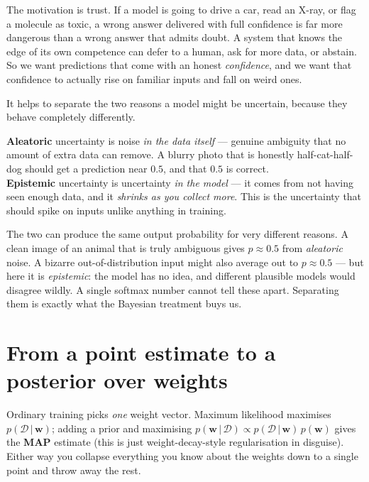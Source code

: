 \documentclass[11pt, oneside]{book}
\newcommand{\dataset}{\mathcal{D}}
\newcommand{\weights}{\mathbf{w}}
\newcommand{\given}{\,\vert\,}
\begin{document}
The motivation is trust. If a model is going to drive a car, read an X-ray, or
flag a molecule as toxic, a wrong answer delivered with full confidence is far
more dangerous than a wrong answer that admits doubt. A system that knows the edge
of its own competence can defer to a human, ask for more data, or abstain. So we
want predictions that come with an honest \emph{confidence}, and we want that
confidence to actually rise on familiar inputs and fall on weird ones.

It helps to separate the two reasons a model might be uncertain, because they
behave completely differently.

\begin{defbox}[title={Aleatoric vs.\ epistemic uncertainty}]
\textbf{Aleatoric} uncertainty is noise \emph{in the data itself} --- genuine
ambiguity that no amount of extra data can remove. A blurry photo that is honestly
half-cat-half-dog should get a prediction near $0.5$, and that $0.5$ is correct.
\\[2pt]
\textbf{Epistemic} uncertainty is uncertainty \emph{in the model} --- it comes
from not having seen enough data, and it \emph{shrinks as you collect more}. This
is the uncertainty that should spike on inputs unlike anything in training.
\end{defbox}

\begin{intbox}
The two can produce the same output probability for very different reasons.
A clean image of an animal that is truly ambiguous gives $p\approx 0.5$ from
\emph{aleatoric} noise. A bizarre out-of-distribution input might also average out
to $p\approx 0.5$ --- but here it is \emph{epistemic}: the model has no idea, and
different plausible models would disagree wildly. A single softmax number cannot
tell these apart. Separating them is exactly what the Bayesian treatment buys us.
\end{intbox}

\section{From a point estimate to a posterior over weights}

Ordinary training picks \emph{one} weight vector. Maximum likelihood maximises
$p(\dataset\given\weights)$; adding a prior and maximising
$p(\weights\given\dataset)\propto p(\dataset\given\weights)\,p(\weights)$ gives the
\textbf{MAP} estimate (this is just weight-decay-style regularisation in disguise).
Either way you collapse everything you know about the weights down to a single
point and throw away the rest.
\end{document}
